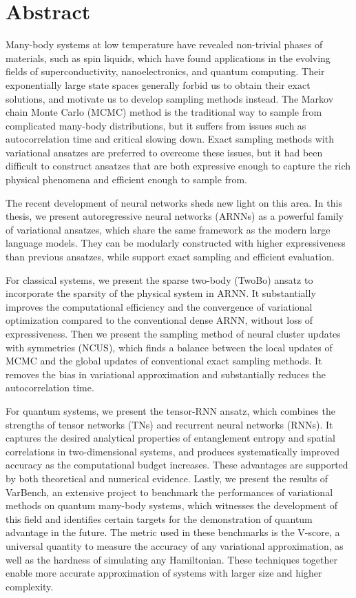 \cleardoublepage
\chapter*{Abstract}

Many-body systems at low temperature have revealed non-trivial phases of materials, such as spin liquids, which have found applications in the evolving fields of superconductivity, nanoelectronics, and quantum computing.
Their exponentially large state spaces generally forbid us to obtain their exact solutions, and motivate us to develop sampling methods instead.
The Markov chain Monte Carlo (MCMC) method is the traditional way to sample from complicated many-body distributions, but it suffers from issues such as autocorrelation time and critical slowing down.
Exact sampling methods with variational ansatzes are preferred to overcome these issues, but it had been difficult to construct ansatzes that are both expressive enough to capture the rich physical phenomena and efficient enough to sample from.

The recent development of neural networks sheds new light on this area.
In this thesis, we present autoregressive neural networks (ARNNs) as a powerful family of variational ansatzes, which share the same framework as the modern large language models.
They can be modularly constructed with higher expressiveness than previous ansatzes, while support exact sampling and efficient evaluation.

For classical systems, we present the sparse two-body (TwoBo) ansatz to incorporate the sparsity of the physical system in ARNN.
It substantially improves the computational efficiency and the convergence of variational optimization compared to the conventional dense ARNN, without loss of expressiveness.
Then we present the sampling method of neural cluster updates with symmetries (NCUS), which finds a balance between the local updates of MCMC and the global updates of conventional exact sampling methods.
It removes the bias in variational approximation and substantially reduces the autocorrelation time.

For quantum systems, we present the tensor-RNN ansatz, which combines the strengths of tensor networks (TNs) and recurrent neural networks (RNNs).
It captures the desired analytical properties of entanglement entropy and spatial correlations in two-dimensional systems, and produces systematically improved accuracy as the computational budget increases.
These advantages are supported by both theoretical and numerical evidence.
Lastly, we present the results of VarBench, an extensive project to benchmark the performances of variational methods on quantum many-body systems, which witnesses the development of this field and identifies certain targets for the demonstration of quantum advantage in the future.
The metric used in these benchmarks is the V-score, a universal quantity to measure the accuracy of any variational approximation, as well as the hardness of simulating any Hamiltonian.
These techniques together enable more accurate approximation of systems with larger size and higher complexity.

